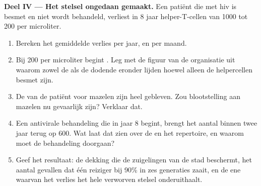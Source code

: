 \begin{problem}
\medskip
\noindent\textbf{Deel IV --- Het stelsel ongedaan gemaakt.}
Een patiënt die met hiv is besmet en niet wordt behandeld, verliest in 8
jaar helper-T-cellen van 1000 tot 200 per microliter.
\begin{enumerate}[resume]
  \item Bereken het gemiddelde verlies per jaar, en per maand.
  \item Bij 200 per microliter begint . Leg met de figuur van de
        organisatie uit waarom zowel de  als de dodende 
        eronder lijden hoewel alleen de helpercellen besmet zijn.
  \item De  van de patiënt voor mazelen zijn heel gebleven.
        Zou blootstelling aan mazelen nu gevaarlijk zijn? Verklaar dat.
  \item Een antivirale behandeling die in jaar 8 begint, brengt het aantal
        binnen twee jaar terug op 600. Wat laat dat zien over de
         en het repertoire, en waarom moet de behandeling
        doorgaan?
  \item Geef het resultaat: de dekking die de zuigelingen van de stad
        beschermt, het aantal gevallen dat één reiziger bij 90\% in zes
        generaties zaait, en de ene  waarvan het verlies het hele
        verworven stelsel onderuithaalt.
\end{enumerate}
\end{problem}
